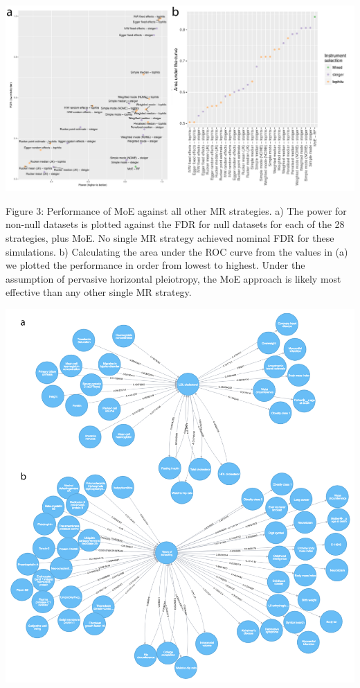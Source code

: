 \documentclass[]{article}
\begin{document}
\includegraphics{images/fig3.pdf}

Figure 3: Performance of MoE against all other MR strategies. a) The
power for non-null datasets is plotted against the FDR for null datasets
for each of the 28 strategies, plus MoE. No single MR strategy achieved
nominal FDR for these simulations. b) Calculating the area under the ROC
curve from the values in (a) we plotted the performance in order from
lowest to highest. Under the assumption of pervasive horizontal
pleiotropy, the MoE approach is likely most effective than any other
single MR strategy.

\newpage

\includegraphics{images/fig4-01.png}
\end{document}
